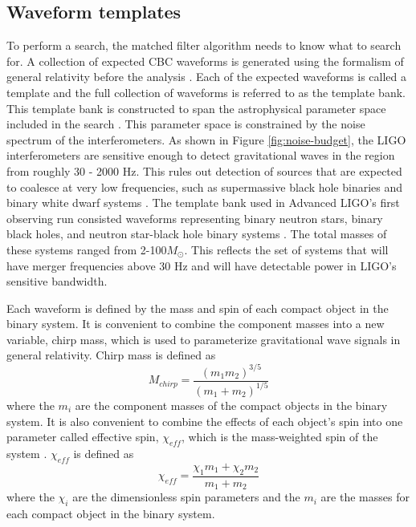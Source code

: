 \subsection{Waveform templates}

To perform a search, the matched filter algorithm needs to know what to search for.
A collection of expected CBC waveforms is generated using
the formalism of general relativity before the analysis \cite{Pan:2009wj,Purrer:2015tud}.
Each of the expected waveforms is called a template and
the full collection of waveforms is referred to as the template bank. This template bank
is constructed to span the astrophysical parameter space included in the search
\cite{GW150914-CBC}. This parameter space is constrained by the noise spectrum of 
the interferometers. As shown in Figure \ref{fig:noise-budget}, the LIGO 
interferometers are sensitive enough to detect gravitational waves in the 
region from roughly 30 - 2000 Hz. This rules out detection of sources that are expected to 
coalesce at very low frequencies, such as supermassive black hole binaries 
\cite{Merloni:2008tj} and 
binary white dwarf systems \cite{PostnovYungelson:2006}. 
The template bank used in Advanced LIGO's first observing 
run consisted waveforms representing binary neutron stars, binary black holes, 
and neutron star-black hole binary systems \cite{GW150914-CBC}. 
The total masses of these systems ranged from 
2-100$M_{\odot}$. This reflects the set of systems that will have merger frequencies 
above 30 Hz and will have detectable power in LIGO's sensitive bandwidth.

Each waveform is defined by the mass and spin of each compact
object in the binary system. 
It is convenient to combine
the component masses into a new variable, chirp mass, which is used to
parameterize gravitational wave signals in general relativity. Chirp mass is defined
as
\begin{equation}
M_{chirp} = \frac{(m_1m_2)^{3/5}}{(m_1 + m_2)^{1/5}}
\end{equation}
where the $m_{i}$ are the component masses of the compact objects in the
binary system. 
It is also convenient to combine the effects of each
object's spin into one parameter called effective spin, $\chi_{eff}$,
which is the
mass-weighted spin of the system \cite{Privitera:2013xza}. $\chi_{eff}$ is defined as
\begin{equation}
\chi_{eff} = \frac{\chi_{1}m_{1} + \chi_{2}m_{2}}{m_{1} + m_{2}}
\end{equation}
where the $\chi_{i}$ are the dimensionless spin parameters \cite{Kidder:1995zr}
and the $m_{i}$ are the masses for each compact object in the binary system. 

